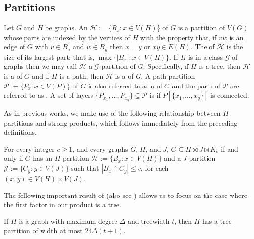 \documentclass{patmorin}
\newcommand\subsetcong{\mathrel{\text{%
    \setbox0\hbox{$\subseteq$}%
    \rlap{\hbox to \wd0{\hss\hss\hss\raisebox{1.5\height}{$\sim$}\hss}}\box0
}}}
\renewcommand{\subsetcong}{\subseteq}
\renewcommand{\le}{\leqslant}
\renewcommand{\ge}{\geqslant}
\begin{document}
\subsection{Partitions}

Let $G$ and $H$ be graphs.  An  $\mathcal{H}:=\{B_x:x\in V(H)\}$ of $G$ is a partition of $V(G)$ whose parts are indexed by the vertices of $H$ with the property that, if $vw$ is an edge of $G$ with $v\in B_x$ and $w\in B_y$ then $x=y$ or $xy\in E(H)$.  The  of $\mathcal{H}$ is the size of its largest part; that is, $\max\{|B_x|:x\in V(H)\}$.
If $H$ is in a class $\mathcal{G}$ of graphs then we may call $\mathcal{H}$ a $\mathcal{G}$-partition of $G$.  Specifically, if $H$ is a tree, then $\mathcal{H}$ is a  of $G$ and if $H$ is a path, then $\mathcal{H}$ is a  of $G$.  A path-partition $\mathcal{P}:=\{P_x:x\in V(P)\}$ of $G$ is also referred to as a  of $G$ and the parts of $\mathcal{P}$ are referred to as .  A set of layers $\{P_{x_1},\ldots,P_{x_q}\}\subseteq\mathcal{P}$ is  if $P[\{x_1,\ldots,x_q\}]$ is connected.

As in previous works, we make use of the following relationship between $H$-partitions and strong products, which follows immediately from the preceding definitions.

\begin{obs}\label{partitions_vs_products}
  For every integer $c\ge 1$, and every graphs $G$, $H$, and $J$,  $G\subsetcong H\boxtimes J\boxtimes K_c$ if and only if $G$ has an $H$-partition $\mathcal{H}:=\{B_x:x\in V(H)\}$ and a $J$-partition $\mathcal{J}:=\{C_y:y\in V(J)\}$ such that $|B_x\cap C_y|\le c$, for each $(x,y)\in V(H)\times V(J)$.
\end{obs}

The following important result of \citet{ding.oporowski:some} (also see \cite{wood:on,distel.wood:tree_partitions}) allows us to focus on the case where the first factor in our product is a tree.

\begin{thm}\label{dingy}
  If $H$ is a graph with maximum degree $\Delta$ and treewidth $t$,
  then $H$ has a tree-partition of width at most $24\Delta(t+1)$.
\end{thm}
\end{document}
